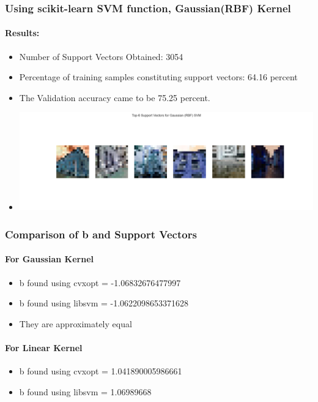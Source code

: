 \documentclass[12pt,a4paper]{article}
\begin{document}
\subsubsection{Using scikit-learn SVM function, Gaussian(RBF) Kernel}
\paragraph{Results:}
\begin{itemize}
    \item Number of Support Vectors Obtained: 3054
    \item Percentage of training samples constituting support vectors: 64.16 percent
    \item The Validation accuracy came to be 75.25 percent.
    \item \includegraphics[width=\textwidth]{Assignment 2/q2/top_6_support_vectors_rbf libsvm rbf.png}
\end{itemize}

\subsubsection{Comparison of b and Support Vectors}
\paragraph{For Gaussian Kernel}
\begin{itemize}
    \item b found using cvxopt = -1.06832676477997
    \item b found using libsvm = -1.0622098653371628
    \item They are approximately equal
\end{itemize}

\paragraph{For Linear Kernel}
\begin{itemize}
    \item b found using cvxopt = 1.041890005986661
    \item b found using libsvm = 1.06989668
\end{itemize}
\end{document}
